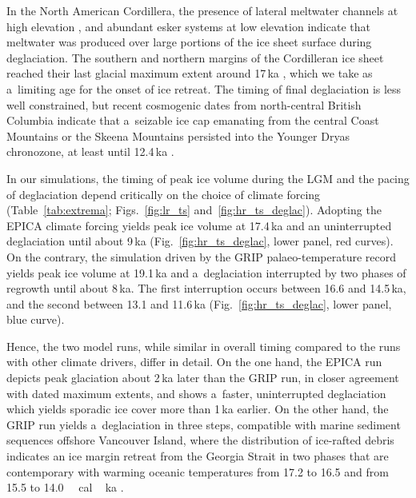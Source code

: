 \documentclass[tc, manuscript]{copernicus}
\begin{document}
      In the North American Cordillera, the presence of lateral meltwater
      channels at high elevation \citep{Margold.etal.2011,
      Margold.etal.2013a, Margold.etal.2014}, and abundant esker systems at
      low elevation \citep{Burke.etal.2012, Burke.etal.2012a,
      Perkins.etal.2013, Margold.etal.2013} indicate that meltwater was
      produced over large portions of the ice sheet surface during
      deglaciation. The southern and northern margins of the Cordilleran ice
      sheet reached their last glacial maximum extent around 17\,\unit{ka}
      \citep[Sect.~\ref{sec:timing};][]{Porter.Swanson.1998,
      Cosma.etal.2008, Stroeven.etal.2010, Stroeven.etal.2014}, which we
      take as a~limiting age for the onset of ice retreat. The timing of
      final deglaciation is less well constrained, but recent cosmogenic
      dates from north-central British Columbia indicate that a~seizable ice
      cap emanating from the central Coast Mountains or the Skeena Mountains
      persisted into the Younger Dryas chronozone, at least until
      12.4\,\unit{ka} \citep{Margold.etal.2014}.

      In our simulations, the timing of peak ice volume during the LGM and
      the pacing of deglaciation depend critically on the choice of climate
      forcing (Table~\ref{tab:extrema}; Figs.~\ref{fig:lr_ts}
      and~\ref{fig:hr_ts_deglac}). Adopting the EPICA climate forcing yields
      peak ice volume at 17.4\,\unit{ka} and an uninterrupted deglaciation
      until about 9\,\unit{ka} (Fig.~\ref{fig:hr_ts_deglac}, lower panel,
      red curves). On the contrary, the simulation driven by the GRIP
      palaeo-temperature record yields peak ice volume at 19.1\,\unit{ka}
      and a~deglaciation interrupted by two phases of regrowth until about
      8\,\unit{ka}. The first interruption occurs between 16.6 and
      14.5\,\unit{ka}, and the second between 13.1 and 11.6\,\unit{ka}
      (Fig.~\ref{fig:hr_ts_deglac}, lower panel, blue curve).

      Hence, the two model runs, while similar in overall timing compared to
      the runs with other climate drivers, differ in detail. On the one
      hand, the EPICA run depicts peak glaciation about 2\,\unit{ka} later
      than the GRIP run, in closer agreement with dated maximum extents, and
      shows a~faster, uninterrupted deglaciation which yields sporadic ice
      cover more than 1\,\unit{ka} earlier. On the other hand, the GRIP run
      yields a~deglaciation in three steps, compatible with marine sediment
      sequences offshore Vancouver Island, where the distribution of
      ice-rafted debris indicates an ice margin retreat from the Georgia
      Strait in two phases that are contemporary with warming oceanic
      temperatures from 17.2 to 16.5 and from 15.5 to
      14.0\,\unit{\,cal\,ka} \citep{Taylor.etal.2014}.
\end{document}
